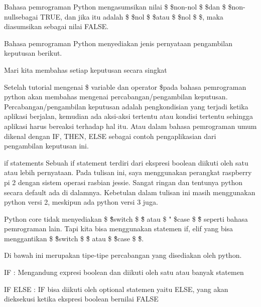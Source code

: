 \noindent 
Bahasa pemrograman Python mengasumsikan nilai \$  \$non-nol \$  \$dan \$  \$non-nullsebagai TRUE, dan jika itu adalah \$  \$nol \$  \$atau \$  \$nol \$  \$, maka diasumsikan sebagai nilai FALSE. \par
\vspace{12pt}
\noindent 
Bahasa pemrograman Python menyediakan jenis pernyataan pengambilan keputusan berikut. \par
\vspace{12pt}
\noindent 
Mari kita membahas setiap keputusan secara singkat  \par
\vspace{12pt}
\noindent 
Setelah tutorial mengenai \$ 
{variable dan operator}
\$pada bahasa pemrograman python akan membahas mengenai percabangan/pengambilan keputusan. Percabangan/pengambilan keputusan adalah pengkondisian yang terjadi ketika aplikasi berjalan, kemudian ada aksi-aksi tertentu atau kondisi tertentu sehingga aplikasi harus bereaksi terhadap hal itu. Atau dalam bahasa pemrograman umum dikenal dengan IF, THEN, ELSE sebagai contoh pengaplikasian dari pengambilan keputusan ini. \par
\vspace{12pt}
if statements
Sebuah if statement terdiri dari ekspresi boolean diikuti oleh satu atau lebih pernyataan.
\noindent 
Pada tulisan ini, saya menggunakan perangkat raspberry pi 2 dengan sistem operasi rasbian jessie. Sangat ringan dan tentunya python secara default ada di dalamnya. Kebetulan dalam tulisan ini masih menggunakan python versi 2, meskipun ada python versi 3 juga. \par
\vspace{12pt}
\noindent 
Python core tidak menyediakan  \$ \" \$switch \$ \" \$ atau  \$ " \$case \$ \" \$ seperti bahasa pemrograman lain. Tapi kita bisa menggunakan statemen if, elif yang bisa menggantikan  \$ \" \$switch \$ \" \$ atau  \$ \" \$case \$ \" \$. \par
\vspace{12pt}
\noindent 
Di bawah ini merupakan tipe-tipe percabangan yang disediakan oleh python. \par
\vspace{12pt}
\noindent 
IF : Mengandung expresi boolean dan diikuti oleh satu atau banyak statemen \par
\vspace{12pt}
\noindent 
IF ELSE : IF bisa diikuti oleh optional statemen yaitu ELSE, yang akan dieksekusi ketika ekspresi boolean bernilai FALSE \par
